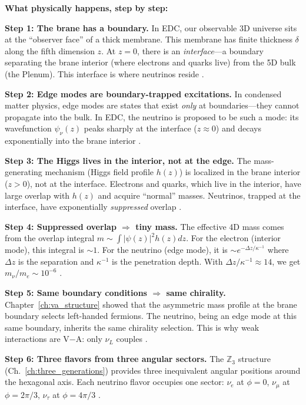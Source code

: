 \begin{tcolorbox}[colback=green!5!white, colframe=green!50!black,
    title=\textbf{Physical Process Narrative: How Neutrinos Become ``Ghostly''}]
\textbf{What physically happens, step by step:}

\textbf{Step 1: The brane has a boundary.}
In EDC, our observable 3D universe sits at the ``observer face'' of a thick membrane.
This membrane has finite thickness $\delta$ along the fifth dimension $z$. At $z = 0$,
there is an \emph{interface}---a boundary separating the brane interior (where electrons
and quarks live) from the 5D bulk (the Plenum). This interface is where neutrinos
reside \tagP{}.

\textbf{Step 2: Edge modes are boundary-trapped excitations.}
In condensed matter physics, edge modes are states that exist \emph{only} at boundaries---they
cannot propagate into the bulk. In EDC, the neutrino is proposed to be such a mode:
its wavefunction $\psi_\nu(z)$ peaks sharply at the interface ($z \approx 0$) and
decays exponentially into the brane interior \tagP{}.

\textbf{Step 3: The Higgs lives in the interior, not at the edge.}
The mass-generating mechanism (Higgs field profile $h(z)$) is localized in the brane
interior ($z > 0$), not at the interface. Electrons and quarks, which live in the
interior, have large overlap with $h(z)$ and acquire ``normal'' masses. Neutrinos,
trapped at the interface, have exponentially \emph{suppressed} overlap \tagDc{}.

\textbf{Step 4: Suppressed overlap $\Rightarrow$ tiny mass.}
The effective 4D mass comes from the overlap integral $m \sim \int |\psi(z)|^2 h(z) dz$.
For the electron (interior mode), this integral is $\sim 1$. For the neutrino (edge mode),
it is $\sim e^{-\Delta z/\kappa^{-1}}$ where $\Delta z$ is the separation and $\kappa^{-1}$
is the penetration depth. With $\Delta z/\kappa^{-1} \approx 14$, we get $m_\nu/m_e \sim 10^{-6}$
\tagDc{}.

\textbf{Step 5: Same boundary conditions $\Rightarrow$ same chirality.}
Chapter~\ref{ch:va_structure} showed that the asymmetric mass profile at the brane
boundary selects left-handed fermions. The neutrino, being an edge mode at this same
boundary, inherits the same chirality selection. This is why weak interactions are
V$-$A: only $\nu_L$ couples \tagDc{}.

\textbf{Step 6: Three flavors from three angular sectors.}
The $\mathbb{Z}_3$ structure (Ch.~\ref{ch:three_generations}) provides three inequivalent
angular positions around the hexagonal axis. Each neutrino flavor occupies one sector:
$\nu_e$ at $\phi = 0$, $\nu_\mu$ at $\phi = 2\pi/3$, $\nu_\tau$ at $\phi = 4\pi/3$ \tagI{}.


\end{tcolorbox}
